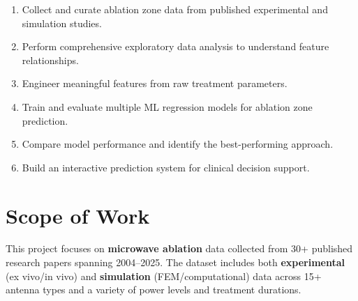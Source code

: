 \begin{enumerate}
    \item Collect and curate ablation zone data from published experimental and simulation studies.
    \item Perform comprehensive exploratory data analysis to understand feature relationships.
    \item Engineer meaningful features from raw treatment parameters.
    \item Train and evaluate multiple ML regression models for ablation zone prediction.
    \item Compare model performance and identify the best-performing approach.
    \item Build an interactive prediction system for clinical decision support.
\end{enumerate}


\section{Scope of Work}

This project focuses on \textbf{microwave ablation} data collected from 30+ published research papers spanning 2004--2025. The dataset includes both \textbf{experimental} (ex vivo/in vivo) and \textbf{simulation} (FEM/computational) data across 15+ antenna types and a variety of power levels and treatment durations.
